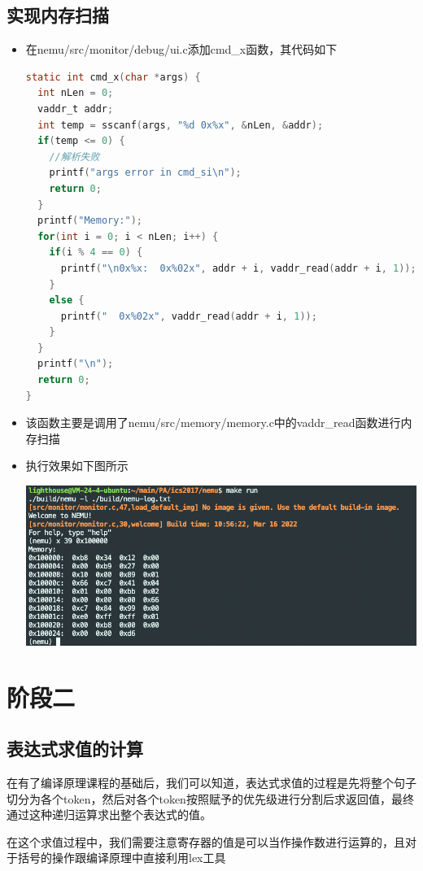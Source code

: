 \documentclass[UTF8,a4paper,10pt]{ctexart}
\begin{document}
\subsection{实现内存扫描}
\begin{itemize}
  \item 在nemu/src/monitor/debug/ui.c添加cmd\_x函数，其代码如下
  \begin{lstlisting}[language = C]
static int cmd_x(char *args) {
  int nLen = 0;
  vaddr_t addr;
  int temp = sscanf(args, "%d 0x%x", &nLen, &addr);
  if(temp <= 0) {
    //解析失败
    printf("args error in cmd_si\n");
    return 0;
  }
  printf("Memory:");
  for(int i = 0; i < nLen; i++) {
    if(i % 4 == 0) {
      printf("\n0x%x:  0x%02x", addr + i, vaddr_read(addr + i, 1));
    }  
    else {
      printf("  0x%02x", vaddr_read(addr + i, 1));
    }
  }
  printf("\n");
  return 0;
}
  \end{lstlisting}
  \item 该函数主要是调用了nemu/src/memory/memory.c中的vaddr\_read函数进行内存扫描
  \item 执行效果如下图所示
  \begin{center}
    \includegraphics[scale = 0.45]{3}
  \end{center}
\end{itemize}

\section{阶段二}
\subsection{表达式求值的计算}
在有了编译原理课程的基础后，我们可以知道，表达式求值的过程是先将整个句子切分为各个token，然后对各个token按照赋予的优先级进行分割后求返回值，最终通过这种递归运算求出整个表达式的值。
\par 在这个求值过程中，我们需要注意寄存器的值是可以当作操作数进行运算的，且对于括号的操作跟编译原理中直接利用lex工具
\end{document}
